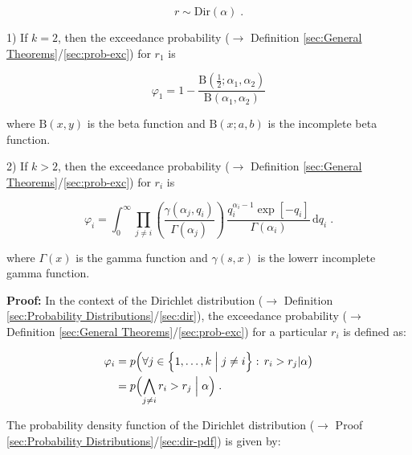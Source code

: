 \documentclass[a4paper,12pt,twoside]{book}
\begin{document}
\begin{equation} \label{eq:dir-ep-r-Dir}
r \sim \mathrm{Dir}(\alpha) \; .
\end{equation}

\vspace{1em}
1) If $k = 2$, then the exceedance probability ($\rightarrow$ Definition \ref{sec:General Theorems}/\ref{sec:prob-exc}) for $r_1$ is

\begin{equation} \label{eq:dir-ep-Dir2-EP}
\varphi_1 = 1 - \frac{\mathrm{B}\left( \frac{1}{2};\alpha_1,\alpha_2 \right)}{\mathrm{B}(\alpha_1,\alpha_2)}
\end{equation}

where $\mathrm{B}(x,y)$ is the beta function and $\mathrm{B}(x;a,b)$ is the incomplete beta function.

\vspace{1em}
2) If $k > 2$, then the exceedance probability ($\rightarrow$ Definition \ref{sec:General Theorems}/\ref{sec:prob-exc}) for $r_i$ is

\begin{equation} \label{eq:dir-ep-Dir-EP}
\varphi_i = \int_0^\infty \prod_{j \neq i} \left( \frac{\gamma(\alpha_j,q_i)}{\Gamma(\alpha_j)} \right) \, \frac{q_i^{\alpha_i-1} \exp[-q_i]}{\Gamma(\alpha_i)} \, \mathrm{d}q_i \; .
\end{equation}

where $\Gamma(x)$ is the gamma function and $\gamma(s,x)$ is the lowerr incomplete gamma function.


\vspace{1em}
\textbf{Proof:} In the context of the Dirichlet distribution ($\rightarrow$ Definition \ref{sec:Probability Distributions}/\ref{sec:dir}), the exceedance probability ($\rightarrow$ Definition \ref{sec:General Theorems}/\ref{sec:prob-exc}) for a particular $r_i$ is defined as:

\begin{equation} \label{eq:dir-ep-Dir-EP-def}
\begin{split}
\varphi_i &= p \Bigl( \forall j \in \left\lbrace 1, \ldots, k \Bigm| j \neq i \right\rbrace: \, r_i > r_j |\alpha \bigr) \\
&= p \Bigl( \bigwedge_{j \neq i} r_i > r_j \Bigm| \alpha \Bigr) \; .
\end{split}
\end{equation}

The probability density function of the Dirichlet distribution ($\rightarrow$ Proof \ref{sec:Probability Distributions}/\ref{sec:dir-pdf}) is given by:
\end{document}
